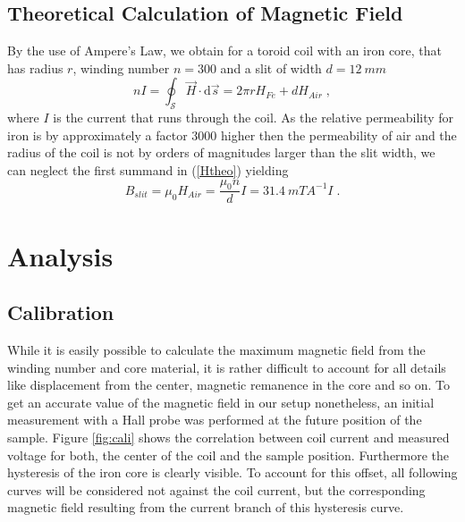\documentclass[a4paper]{scrartcl}
\numberwithin{equation}{section}
\numberwithin{figure}{section}
\numberwithin{table}{section}
\newcommand{\eq}[2]{\begin{equation}#1\label{#2}\end{equation}}
\newcommand{\Formel}[1]{(\ref{#1})}
\begin{document}
\subsection{Theoretical Calculation of Magnetic Field}
By the use of Ampere's Law, we obtain for a toroid coil with an iron core, that has radius $r$, winding number $n=300$ and a slit of width $d=\SI{12}{mm}$
\eq{nI=\oint_{\mathcal S} \vec{H} \cdot \mathrm{d}\vec{s} = 2 \pi r H_{Fe} + d H_{Air} \;, }{Htheo}
where $I$ is the current that runs through the coil. As the relative permeability for iron is by approximately a factor $3000$ higher then the permeability of air and the radius of the coil is not by orders of magnitudes larger than the slit width, we can neglect the first summand in \Formel{Htheo} yielding
\eq{B_{slit} =  \mu_0  H_{Air}= \frac{\mu_0 n}{d} I = \SI{31.4}{mT A^{-1}} I \; .}{}

\FloatBarrier
 
\section{Analysis}
\subsection{Calibration}
\label{sec:cali}
While it is easily possible to calculate the maximum magnetic field from the winding number and core material, it is rather difficult to account for all details like displacement from the center, magnetic remanence in the core and so on. To get an accurate value of the magnetic field in our setup nonetheless, an initial measurement with a Hall probe was performed at the future position of the sample. Figure \ref{fig:cali} shows the correlation between coil current and measured voltage for both, the center of the coil and the sample position. Furthermore the hysteresis of the iron core is clearly visible. To account for this offset, all following curves will be considered not against the coil current, but the corresponding magnetic field resulting from the current branch of this hysteresis curve.
\end{document}
